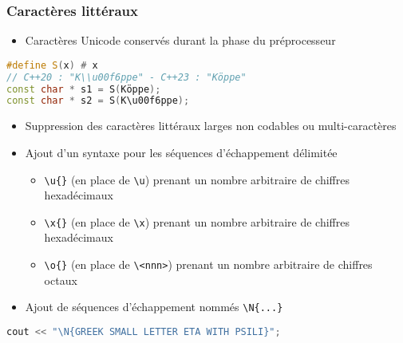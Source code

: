 \documentclass[C++.tex]{subfiles}
\begin{document}
\begin{frame}[fragile]
	\frametitle{Caractères littéraux}
	\begin{itemize}
		\item Caractères Unicode conservés durant la phase du préprocesseur
	\end{itemize}

	\begin{lstlisting}[language=C++]
#define S(x) # x
// C++20 : "K\\u00f6ppe" - C++23 : "Köppe"
const char * s1 = S(Köppe);
const char * s2 = S(K\u00f6ppe);\end{lstlisting}


	\begin{itemize}
		\item Suppression des caractères littéraux larges non codables ou multi-caractères
		\item Ajout d'un syntaxe pour les séquences d'échappement délimitée
		\begin{itemize}
			\item \lstinline|\u{}| (en place de \lstinline|\u|) prenant un nombre arbitraire de chiffres hexadécimaux
			\item \lstinline|\x{}| (en place de \lstinline|\x|) prenant un nombre arbitraire de chiffres hexadécimaux
			\item \lstinline|\o{}| (en place de \lstinline|\<nnn>|) prenant un nombre arbitraire de chiffres octaux
		\end{itemize} 
		\item Ajout de séquences d'échappement nommés \lstinline|\N{...}|
	\end{itemize}

	\begin{lstlisting}[language=C++]
cout << "\N{GREEK SMALL LETTER ETA WITH PSILI}";\end{lstlisting}
\end{frame}
\end{document}
